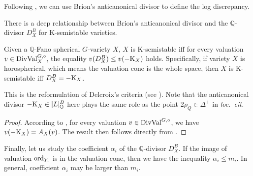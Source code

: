 Following , we can use Brion's anticanonical divisor to define the log discrepancy.

There is a deep relationship between Brion's anticanonical divisor and the $\mathbb{Q}$-divisor $D^B_X$ for K-semistable varieties.
\begin{corollary}
    Given a $\mathbb{Q}$-Fano spherical $G$-variety $X$, $X$ is K-semistable iff for every valuation $v \in \mathrm{DivVal}^{G, \circ}_X$, the equality $v(D^B_X) \leq v(-\mathrm{K}_X)$ holds. Specifically, if variety $X$ is horospherical, which means the valuation cone is the whole space, then $X$ is K-semistable iff $D^B_X = -\mathrm{K}_X$.
\end{corollary}
\begin{remark*}
    This is the reformulation of Delcroix's criteria (see \cite[Theorem 5.3 and Corollary 5.7]{Delcroix_Kst_Fano_spher}). Note that the anticanonical divisor $-\mathrm{K}_X \in \mathopen{}\left|L\right|\mathclose{}_\mathbb{Q}^B$ here plays the same role as the point $2 \rho_Q \in \Delta^+$ in \textit{loc.~cit.}
\end{remark*}
\begin{proof}
    According to \cite[Proof of Proposition 5.2]{Pas_sing_sphe}, for every valuation $v \in \mathrm{DivVal}^{G, \circ}$, we have $v(-\mathrm{K}_X) = A_X(v)$. The result then follows directly from .
\end{proof}

Finally, let us study the coefficient $\alpha_i$ of the $\mathbb{Q}$-divisor $D^B_X$. If the image of valuation $\mathrm{ord}_{Y_i}$ is in the valuation cone, then we have the inequality $\alpha_i \leq m_i$. In general, coefficient $\alpha_i$ may be larger than $m_i$.
